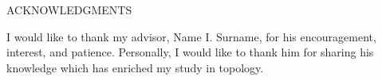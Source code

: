 \begin{center}
ACKNOWLEDGMENTS
\end{center}

I would like to thank my advisor, Name I. Surname, for his encouragement,
interest, and patience. Personally, I would like to thank him
for sharing his knowledge which has enriched my study in
topology.
